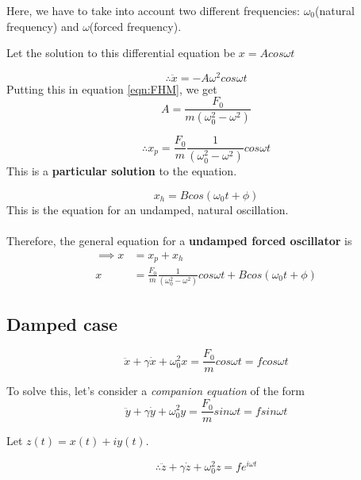 \documentclass[12pt]{article}
\begin{document}
Here, we have to take into account two different frequencies:
$\omega_0$(natural frequency) and $\omega$(forced frequency).

Let the solution to this differential equation be $x = A cos {\omega t}$

\begin{equation*}
	\therefore \ddot{x} = -A \omega^2 cos \omega t
\end{equation*}
Putting this in equation \ref{eqn:FHM}, we get
\begin{equation*}
	A = \frac{F_0}{m \left( \omega_0^2 - \omega^2 \right)}
\end{equation*}

\begin{equation*}
	\therefore x_p = \frac{F_0}{m} \frac{1}{ \left( \omega_0^2 - \omega^2 \right) } cos \omega t
\end{equation*}
This is a \textbf{particular solution} to the equation.

\begin{equation*}
	x_h = B cos \left( \omega_0 t + \phi \right)
\end{equation*}
This is the equation for an undamped, natural oscillation. \\ \\
Therefore, the general equation for a \textbf{undamped forced oscillator} is
\begin{align*}
	\implies x &=  x_p + x_h \\
	x &=  \frac{F_0}{m} \frac{1}{ \left( \omega_0^2 - \omega^2 \right) } cos \omega t + B cos \left( \omega_0 t + \phi \right)
\end{align*}

\subsection{Damped case}

\begin{equation*}
	\ddot{x} + \gamma \dot{x} + \omega_0^2 x = \frac{F_0}{m} cos \omega t = f cos \omega t
\end{equation*}

To solve this, let's consider a \textit{companion equation} of the form
\begin{equation*}
	\ddot{y} + \gamma \dot{y} + \omega_0^2 y = \frac{F_0}{m} sin \omega t = f sin \omega t
\end{equation*}

Let $z(t) = x(t) + i y(t)$.

\begin{equation*}
	\therefore \ddot{z} + \gamma \dot{z} + \omega_0^2 z = f e^{i\omega t}
\end{equation*}
\end{document}
